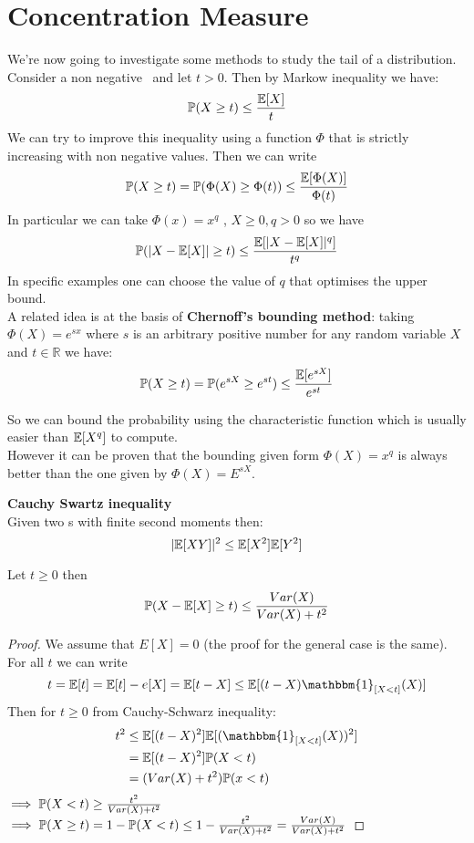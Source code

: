 \chapter{Concentration Measure}
\label{cha:Prop R S}
\vspace{15pt}


We're now going to investigate some methods to study the tail of a distribution.\\
Consider a non negative \rv \  and let $t>0$. Then by Markow inequality we have:
$$\mathbb{P} (X\geq t)\leq \frac{\mathbb{E} [X]}{t}$$
We can try to improve this inequality using a function $\Phi$ that is strictly increasing with non negative values. Then we can write
$$\mathbb{P} (X\geq t)=\mathbb{P} (\Phi(X)\geq \Phi(t) )\leq \frac{ \mathbb{E} [\Phi(X)]}{\Phi(t)}$$
In particular we can take $\Phi(x)=x^q$ , $X\geq 0, q>0$ so we have
$$\mathbb{P} (|X- \mathbb{E} [X]|\geq t)\leq \frac{ \mathbb{E} [|X-\mathbb{E} [X]|^q]}{t^q}$$
In specific examples one can choose the value of $q$ that optimises the upper bound.\\
A related idea is at the basis of \textbf{Chernoff's bounding method}: taking $\Phi(X)=e^{sx}$ where $s$ is an arbitrary positive number for any random variable $X$ and $t\in \mathbb{R}$ we have:
\begin{equation}\label{ineq:Chernoffb}
	\mathbb{P} (X \geq t)= \mathbb{P} (e^{sX}\geq e^{st})\leq \frac{\mathbb{E}[e^{sX}]}{e^{st}}
\end{equation}

So we can bound the probability using the characteristic function which is usually easier than $\mathbb{E} [X^q]$ to compute.\\
However it can be proven that the bounding given form $\Phi (X)=x^q$ is always better than the one given by $\Phi(X)=E^{sX}$.\\
\begin{teo}\textbf{Cauchy Swartz inequality}\\
	Given two \rv s with finite second moments then:
	$$|\mathbb{E}[XY]|^2\leq \mathbb{E}[X^2]\mathbb{E}[Y^2]$$
\end{teo}

\begin{teo}
	Let $t\geq 0$ then
	$$\mathbb{P}(X - \mathbb{E}[X]\geq t)\leq \frac{Var(X)}{Var(X)+t^2}$$
\end{teo}
\begin{proof}
	We assume that $E[X]=0$ (the proof for the general case is the same).\\
	For all $t$ we can write 
	$$t=\e[t]=\e[t]-e[X]=\e[t-X]\leq \e[(t-X)\mathbbm{1}_{[X<t]}(X)]$$
	Then for $t\geq 0$ from Cauchy-Schwarz inequality:
	\[
	\begin{split}
	t^2 
	& \leq \e[(t-X)^2] \e[(\mathbbm{1}_{[X<t]}(X))^2]\\
	&= \e[(t-X)^2] \p(X<t)\\
	&= (Var(X)+t^2)\p(x<t)
	\end{split}	
	\]
	$\implies \mathbb{P}(X<t)\geq \frac{t^2}{Var(X)+t^2}$\\
	$\implies \mathbb{P}(X\geq t)= 1-\mathbb{P}(X<t)\leq 1-\frac{t^2}{Var(X)+t^2}= \frac{Var(X)}{Var(X)+t^2} $
\end{proof}

